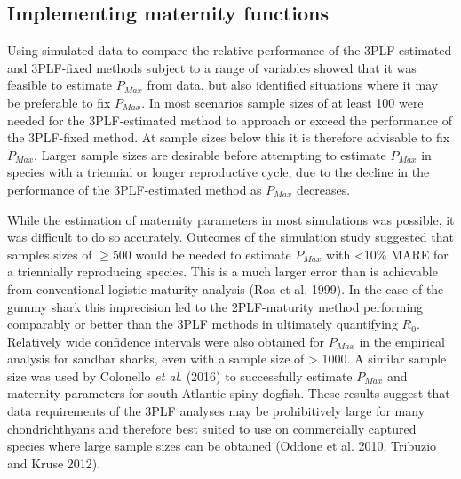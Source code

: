 \documentclass[
]{article}
\begin{document}
\subsection{Implementing maternity functions}\label{implementing-maternity-functions}

Using simulated data to compare the relative performance of the 3PLF-estimated and 3PLF-fixed methods subject to a range of variables showed that it was feasible to estimate \(P_{Max}\) from data, but also identified situations where it may be preferable to fix \(P_{Max}\). In most scenarios sample sizes of at least 100 were needed for the 3PLF-estimated method to approach or exceed the performance of the 3PLF-fixed method. At sample sizes below this it is therefore advisable to fix \(P_{Max}\). Larger sample sizes are desirable before attempting to estimate \(P_{Max}\) in species with a triennial or longer reproductive cycle, due to the decline in the performance of the 3PLF-estimated method as \(P_{Max}\) decreases.

While the estimation of maternity parameters in most simulations was possible, it was difficult to do so accurately. Outcomes of the simulation study suggested that samples sizes of \(\geq500\) would be needed to estimate \(P_{Max}\) with \textless10\% MARE for a triennially reproducing species. This is a much larger error than is achievable from conventional logistic maturity analysis (Roa et al. 1999). In the case of the gummy shark this imprecision led to the 2PLF-maturity method performing comparably or better than the 3PLF methods in ultimately quantifying \(R_0\). Relatively wide confidence intervals were also obtained for \(P_{Max}\) in the empirical analysis for sandbar sharks, even with a sample size of \textgreater{} 1000. A similar sample size was used by Colonello \emph{et al}. (2016) to successfully estimate \(P_{Max}\) and maternity parameters for south Atlantic spiny dogfish. These results suggest that data requirements of the 3PLF analyses may be prohibitively large for many chondrichthyans and therefore best suited to use on commercially captured species where large sample sizes can be obtained (Oddone et al. 2010, Tribuzio and Kruse 2012).
\end{document}
